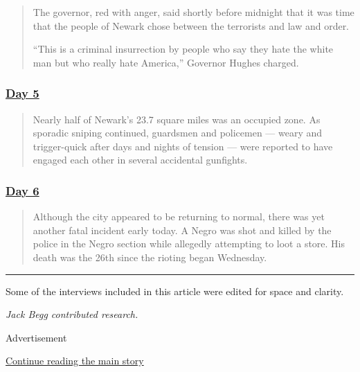 \begin{quote}
The governor, red with anger, said shortly before midnight that it was
time that the people of Newark chose between the terrorists and law and
order.

``This is a criminal insurrection by people who say they hate the white
man but who really hate America,'' Governor Hughes charged.~
\end{quote}

\hypertarget{day-5}{%
\subsubsection{\texorpdfstring{\href{https://timesmachine.nytimes3xbfgragh.onion/timesmachine/1967/07/17/90374734.html?pageNumber=1}{Day
5}}{Day 5}}\label{day-5}}

\begin{quote}
Nearly half of Newark's 23.7 square miles was an occupied zone. As
sporadic sniping continued, guardsmen and policemen --- weary and
trigger-quick after days and nights of tension --- were reported to have
engaged each other in several accidental gunfights.
\end{quote}

\hypertarget{day-6}{%
\subsubsection{\texorpdfstring{\href{https://timesmachine.nytimes3xbfgragh.onion/timesmachine/1967/07/18/90375517.html?pageNumber=1}{Day
6}}{Day 6}}\label{day-6}}

\begin{quote}
Although the city appeared to be returning to normal, there was yet
another fatal incident early today. A Negro was shot and killed by the
police in the Negro section while allegedly attempting to loot a store.
His death was the 26th since the rioting began Wednesday.
\end{quote}

\begin{center}\rule{0.5\linewidth}{\linethickness}\end{center}

Some of the interviews included in this article were edited for space
and clarity.

\emph{Jack Begg contributed research.}

Advertisement

\protect\hyperlink{after-bottom}{Continue reading the main story}

